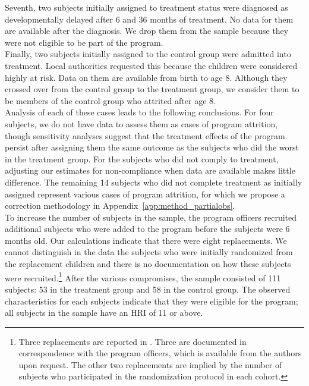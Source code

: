 \noindent Seventh, two subjects initially assigned to treatment status were diagnosed as developmentally delayed after 6 and 36 months of treatment. No data for them are available after the diagnosis. We drop them from the sample because they were not eligible to be part of the program.\\

\noindent Finally, two subjects initially assigned to the control group were admitted into treatment. Local authorities requested this because the children were considered highly at risk. Data on them are available from birth to age 8. Although they crossed over from the control group to the treatment group, we consider them to be members of the control group who attrited after age 8.\\

\noindent Analysis of each of these cases leads to the following conclusions. For four subjects, we do not have data to assess them as cases of program attrition, though sensitivity analyses suggest that the treatment effects of the program persist after assigning them the same outcome as the subjects who did the worst in the treatment group. For the subjects who did not comply to treatment, adjusting our estimates for non-compliance when data are available makes little difference. The remaining 14 subjects who did not complete treatment as initially assigned represent various cases of program attrition, for which we propose a correction methodology in Appendix~\ref{app:method_partialobs}.\\

\noindent To increase the number of subjects in the sample, the program officers recruited additional subjects who were added to the program before the subjects were 6 months old. Our calculations indicate that there were eight replacements. We cannot distinguish in the data the subjects who were initially randomized from the replacement children and there is no documentation on how these subjects were recruited.\footnote{Three replacements are reported in \citet{Ramey_Campbell_1979_SR}. Three are documented in correspondence with the program officers, which is available from the authors upon request. The other two replacements are implied by the number of subjects who participated in the randomization protocol in each cohort.} After the various compromises, the sample consisted of 111 subjects: 53 in the treatment group and 58 in the control group. The observed characteristics for each subjects indicate that they were eligible for the program; all subjects in the sample have an HRI of 11 or above. \\

